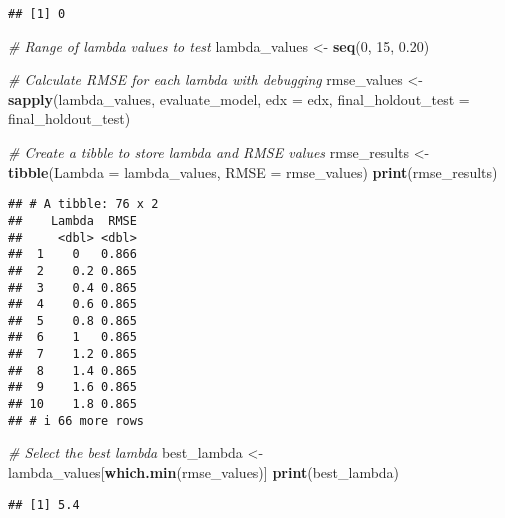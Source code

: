 \documentclass[
]{article}
\newenvironment{Shaded}{\begin{snugshade}}{\end{snugshade}}
\newcommand{\AttributeTok}[1]{\textcolor[rgb]{0.13,0.29,0.53}{#1}}
\newcommand{\CommentTok}[1]{\textcolor[rgb]{0.56,0.35,0.01}{\textit{#1}}}
\newcommand{\DecValTok}[1]{\textcolor[rgb]{0.00,0.00,0.81}{#1}}
\newcommand{\FloatTok}[1]{\textcolor[rgb]{0.00,0.00,0.81}{#1}}
\newcommand{\FunctionTok}[1]{\textcolor[rgb]{0.13,0.29,0.53}{\textbf{#1}}}
\newcommand{\NormalTok}[1]{#1}
\newcommand{\OtherTok}[1]{\textcolor[rgb]{0.56,0.35,0.01}{#1}}
\begin{document}
\begin{verbatim}
## [1] 0
\end{verbatim}

\begin{Shaded}
\begin{Highlighting}[]
\CommentTok{\# Range of lambda values to test}
\NormalTok{lambda\_values }\OtherTok{\textless{}{-}} \FunctionTok{seq}\NormalTok{(}\DecValTok{0}\NormalTok{, }\DecValTok{15}\NormalTok{, }\FloatTok{0.20}\NormalTok{)}

\CommentTok{\# Calculate RMSE for each lambda with debugging}
\NormalTok{rmse\_values }\OtherTok{\textless{}{-}} \FunctionTok{sapply}\NormalTok{(lambda\_values, evaluate\_model, }\AttributeTok{edx =}\NormalTok{ edx, }\AttributeTok{final\_holdout\_test =}\NormalTok{ final\_holdout\_test)}

\CommentTok{\# Create a tibble to store lambda and RMSE values}
\NormalTok{rmse\_results }\OtherTok{\textless{}{-}} \FunctionTok{tibble}\NormalTok{(}\AttributeTok{Lambda =}\NormalTok{ lambda\_values, }\AttributeTok{RMSE =}\NormalTok{ rmse\_values)}
\FunctionTok{print}\NormalTok{(rmse\_results)}
\end{Highlighting}
\end{Shaded}

\begin{verbatim}
## # A tibble: 76 x 2
##    Lambda  RMSE
##     <dbl> <dbl>
##  1    0   0.866
##  2    0.2 0.865
##  3    0.4 0.865
##  4    0.6 0.865
##  5    0.8 0.865
##  6    1   0.865
##  7    1.2 0.865
##  8    1.4 0.865
##  9    1.6 0.865
## 10    1.8 0.865
## # i 66 more rows
\end{verbatim}

\begin{Shaded}
\begin{Highlighting}[]
\CommentTok{\# Select the best lambda}
\NormalTok{best\_lambda }\OtherTok{\textless{}{-}}\NormalTok{ lambda\_values[}\FunctionTok{which.min}\NormalTok{(rmse\_values)]}
\FunctionTok{print}\NormalTok{(best\_lambda)}
\end{Highlighting}
\end{Shaded}

\begin{verbatim}
## [1] 5.4
\end{verbatim}
\end{document}
